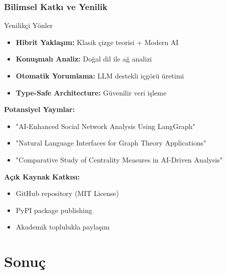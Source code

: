\documentclass[aspectratio=169]{beamer}
\begin{document}
\begin{frame}
\frametitle{Bilimsel Katkı ve Yenilik}
\begin{block}{Yenilikçi Yönler}
\begin{itemize}
    \item \textbf{Hibrit Yaklaşım:} Klasik çizge teorisi + Modern AI
    \item \textbf{Konuşmalı Analiz:} Doğal dil ile ağ analizi
    \item \textbf{Otomatik Yorumlama:} LLM destekli içgörü üretimi
    \item \textbf{Type-Safe Architecture:} Güvenilir veri işleme
\end{itemize}
\end{block}

\vspace{0.3cm}
\textbf{Potansiyel Yayınlar:}
\begin{itemize}
    \item "AI-Enhanced Social Network Analysis Using LangGraph"
    \item "Natural Language Interfaces for Graph Theory Applications"
    \item "Comparative Study of Centrality Measures in AI-Driven Analysis"
\end{itemize}

\vspace{0.3cm}
\textbf{Açık Kaynak Katkısı:}
\begin{itemize}
    \item GitHub repository (MIT License)
    \item PyPI package publishing
    \item Akademik toplulukla paylaşım
\end{itemize}
\end{frame}

\section{Sonuç}
\end{document}
